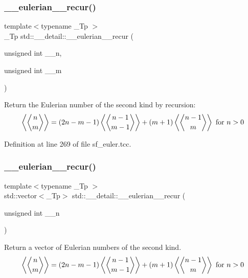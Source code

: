 \subsubsection{\texorpdfstring{\+\_\+\+\_\+eulerian\+\_\+\_\+recur()}{\_\_eulerian\_2\_recur()}\hspace{0.1cm}{\footnotesize\ttfamily [1/2]}}
{\footnotesize\ttfamily template$<$typename \+\_\+\+Tp $>$ \\
\+\_\+\+Tp std\+::\+\_\+\+\_\+detail\+::\+\_\+\+\_\+eulerian\+\_\+\_\+recur (\begin{DoxyParamCaption}\item[{unsigned int}]{\+\_\+\+\_\+n,  }\item[{unsigned int}]{\+\_\+\+\_\+m }\end{DoxyParamCaption})}

Return the Eulerian number of the second kind by recursion\+: \[ \left\langle\genfrac{\langle}{\rangle}{0pt}{0}{n}{m}\right\rangle = (2n-m-1) \left\langle\genfrac{\langle}{\rangle}{0pt}{0}{n-1}{m-1}\right\rangle + (m+1) \left\langle\genfrac{\langle}{\rangle}{0pt}{0}{n-1}{m}\right\rangle \mbox{ for } n > 0 \] 

Definition at line 269 of file sf\+\_\+euler.\+tcc.

\mbox{\label{namespacestd_1_1____detail_a5609870200a041b3ace18c15e212a275}} 
\subsubsection{\texorpdfstring{\+\_\+\+\_\+eulerian\+\_\+\_\+recur()}{\_\_eulerian\_2\_recur()}\hspace{0.1cm}{\footnotesize\ttfamily [2/2]}}
{\footnotesize\ttfamily template$<$typename \+\_\+\+Tp $>$ \\
std\+::vector$<$\+\_\+\+Tp$>$ std\+::\+\_\+\+\_\+detail\+::\+\_\+\+\_\+eulerian\+\_\+\_\+recur (\begin{DoxyParamCaption}\item[{unsigned int}]{\+\_\+\+\_\+n }\end{DoxyParamCaption})}

Return a vector of Eulerian numbers of the second kind. \[ \left\langle\genfrac{\langle}{\rangle}{0pt}{0}{n}{m}\right\rangle = (2n-m-1) \left\langle\genfrac{\langle}{\rangle}{0pt}{0}{n-1}{m-1}\right\rangle + (m+1) \left\langle\genfrac{\langle}{\rangle}{0pt}{0}{n-1}{m}\right\rangle \mbox{ for } n > 0 \] 

